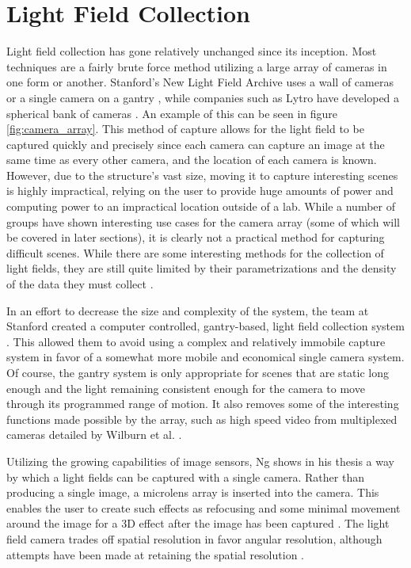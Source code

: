 \documentclass[12pt]{report}
\begin{document}
\section{Light Field Collection}
Light field collection has gone relatively unchanged since its inception. Most techniques are a fairly brute force method utilizing a large array of cameras in one form or another. Stanford's New Light Field Archive uses a wall of cameras or a single camera on a gantry \cite{lfArchive}, while companies such as Lytro have developed a spherical bank of cameras \cite{lytro}. An example of this can be seen in figure \ref{fig:camera_array}. This method of capture allows for the light field to be captured quickly and precisely since each camera can capture an image at the same time as every other camera, and the location of each camera is known. However, due to the structure's vast size, moving it to capture interesting scenes is highly impractical, relying on the user to provide huge amounts of power and computing power to an impractical location outside of a lab. While a number of groups have shown interesting use cases for the camera array (some of which will be covered in later sections), it is clearly not a practical method for capturing difficult scenes. While there are some interesting methods for the collection of light fields, they are still quite limited by their parametrizations and the density of the data they must collect \cite{Ihrke16}.

In an effort to decrease the size and complexity of the system, the team at Stanford created a computer controlled, gantry-based, light field collection system \cite{Koller04}. This allowed them to avoid using a complex and relatively immobile capture system in favor of a somewhat more mobile and economical single camera system. Of course, the gantry system is only appropriate for scenes that are static long enough and the light remaining consistent enough for the camera to move through its programmed range of motion. It also removes some of the interesting functions made possible by the array, such as high speed video from multiplexed cameras detailed by Wilburn et al. \cite{Wilburn05}.

Utilizing the growing capabilities of image sensors, Ng shows in his thesis a way by which a light fields can be captured with a single camera. Rather than producing a single image, a microlens array is inserted into the camera. This enables the user to create such effects as refocusing and some minimal movement around the image for a 3D effect after the image has been captured \cite{Ng06, Ng05, Perwass12}. The light field camera trades off spatial resolution in favor angular resolution, although attempts have been made at retaining the spatial resolution \cite{Georgeiv06}.
\end{document}
